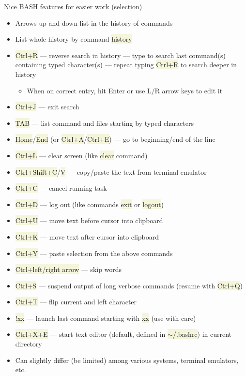 \documentclass[compress, ucs, xelatex, 11pt, xcolor=svgnames, aspectratio=169,
	hyperref={
		bookmarks=true,
		unicode=true,
		colorlinks=true,
		pdftitle={Linux, command line and MetaCentrum},
		plainpages=false,
		pdfauthor={Vojtech Zeisek},
		pdfsubject={Course about use of Linux command line, writing shell scripts and using MetaCentrum of CESNET},
		pdfcreator={XeLaTeX},
		pdfkeywords={Linux, GNU, BASH, shell, command line, MetaCentrum},
		linkcolor=DarkRed, %
		anchorcolor=DarkBlue, %
		citecolor=Indigo, %
		filecolor=NavyBlue, %
		menucolor=DarkMagenta, %
		urlcolor=DarkBlue, %
		pdftex},
	url={hyphens, lowtilde} %
	]{beamer}
\renewcommand{\texttt}[1]{\colorbox{Beige}{{\ttfamily #1}}}
\begin{document}
\begin{frame}[allowframebreaks]{Nice BASH features for easier work (selection)}
	\begin{itemize}
		\item Arrows up and down list in the history of commands
		\item List whole history by command \texttt{history}
		\item \texttt{Ctrl+R} --- reverse search in history --- type to search last command(s) containing typed character(s) --- repeat typing \texttt{Ctrl+R} to search deeper in history
		\begin{itemize}
			\item When on correct entry, hit Enter or use L/R arrow keys to edit it
		\end{itemize}
		\item \texttt{Ctrl+J} --- exit search
		\item \texttt{TAB} --- list command and files starting by typed characters
		\item \texttt{Home}/\texttt{End} (or \texttt{Ctrl+A}/\texttt{Ctrl+E}) --- go to beginning/end of the line
		\item \texttt{Ctrl+L} --- clear screen (like \texttt{clear} command)
		\item \texttt{Ctrl+Shift+C}/\texttt{V} --- copy/paste the text from terminal emulator
		\item \texttt{Ctrl+C} --- cancel running task
		\item \texttt{Ctrl+D} --- log out (like commands \texttt{exit} or \texttt{logout})
		\item \texttt{Ctrl+U} --- move text before cursor into clipboard
		\item \texttt{Ctrl+K} --- move text after cursor into clipboard
		\item \texttt{Ctrl+Y} --- paste selection from the above commands
		\item \texttt{Ctrl+left/right arrow} --- skip words
		\item \texttt{Ctrl+S} --- suspend output of long verbose commands (resume with \texttt{Ctrl+Q})
		\item \texttt{Ctrl+T} --- flip current and left character
		\item \texttt{!xx} --- launch last command starting with \texttt{xx} (use with care)
		\item \texttt{Ctrl+X+E} --- start text editor (default, defined in \texttt{$\sim$/.bashrc}) in current directory
		\item Can slightly differ (be limited) among various systems, terminal emulators, etc.
	\end{itemize}
\end{frame}
\end{document}
